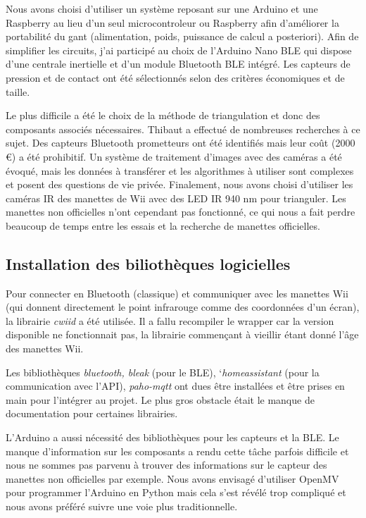 \documentclass[10pt]{article}
\begin{document}
            Nous avons choisi d'utiliser un système reposant sur une Arduino et une Raspberry
                au lieu d'un seul microcontroleur ou Raspberry afin d'améliorer la portabilité du gant
                (alimentation, poids, puissance de calcul a posteriori). Afin de simplifier les circuits, j'ai participé au choix de l'Arduino Nano BLE
                qui dispose d'une centrale inertielle et d'un module Bluetooth BLE intégré.
                Les capteurs de pression et de contact ont été sélectionnés selon des critères économiques
                et de taille.

            Le plus difficile a été le choix de la méthode de triangulation et donc des composants associés nécessaires.
                Thibaut a effectué de nombreuses recherches à ce sujet.
                Des capteurs Bluetooth prometteurs ont été identifiés mais leur coût (2000 €) a été prohibitif.
                Un système de traitement d'images avec des caméras a été évoqué, mais les données à transférer
                et les algorithmes à utiliser sont complexes et posent des questions de vie privée.
                Finalement, nous avons choisi d'utiliser les caméras IR des manettes de Wii avec des LED IR 940 nm
            pour trianguler. Les manettes non officielles n'ont cependant pas fonctionné, ce qui nous a fait
            perdre beaucoup de temps entre les essais et la recherche de manettes officielles.

        \subsection{Installation des biliothèques logicielles}

            Pour connecter en Bluetooth (classique) et communiquer avec les manettes Wii (qui donnent directement le point infrarouge comme des coordonnées d'un écran),
                la librairie \emph{cwiid} a été utilisée. Il a fallu recompiler le wrapper car la version disponible ne fonctionnait pas, la librairie commençant à vieillir
                étant donné l'âge des manettes Wii.           

            Les bibliothèques \emph{bluetooth, bleak} (pour le BLE), `\emph{homeassistant} (pour la communication avec l'API), \emph{paho-mqtt} ont dues être installées et être prises en main pour l'intégrer 
                au projet. Le plus gros obstacle était le manque de documentation pour certaines librairies.

            L'Arduino a aussi nécessité des bibliothèques pour les capteurs et la BLE.
                Le manque d'information sur les composants a rendu cette tâche parfois difficile et nous ne sommes pas 
                parvenu à trouver des informations sur le capteur des manettes non officielles par exemple.
            Nous avons envisagé d'utiliser OpenMV pour programmer l'Arduino en Python mais cela s'est révélé trop compliqué
                et nous avons préféré suivre une voie plus traditionnelle.
            
\end{document}
